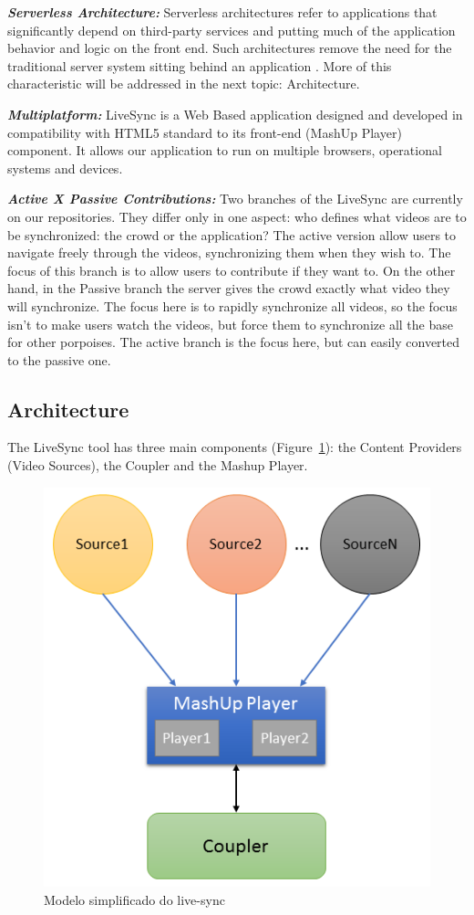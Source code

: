 \documentclass{sig-alternate-05-2015}
\begin{document}
\textbf{\textit{Serverless Architecture:}} Serverless architectures refer to applications that significantly depend on third-party services and putting much of the application behavior and logic on the front end. Such architectures remove the need for the traditional server system sitting behind an application \cite{RobertServerless}. More of this characteristic will be addressed in the next topic: Architecture.

\textbf{\textit{Multiplatform:}} LiveSync is a Web Based application designed and developed in compatibility with HTML5 standard to its front-end (MashUp Player) component. It allows our application to run on multiple browsers, operational systems and devices.

\textbf{\textit{Active X Passive Contributions:}} Two branches of the LiveSync are currently on our repositories. They differ only in one aspect: who defines what videos are to be synchronized: the crowd or the application? The active version allow users to navigate freely through the videos, synchronizing them when they wish to. The focus of this branch is to allow users to contribute if they want to. On the other hand, in the Passive branch the server gives the crowd exactly what video they will synchronize. The focus here is to rapidly synchronize all videos, so the focus isn't to make users watch the videos, but force them to synchronize all the base for other porpoises. The active branch is the focus here, but can easily converted to the passive one.

\subsection{Architecture}
The LiveSync tool has three main components (Figure~\ref{livesync}): the Content Providers (Video Sources), the Coupler and the Mashup Player.

\begin{figure}
	\centerline{\includegraphics[scale=0.4] {figure/arqchitecture}}
	\caption{Modelo simplificado do live-sync}
	\label{livesync}
\end{figure}
\end{document}
